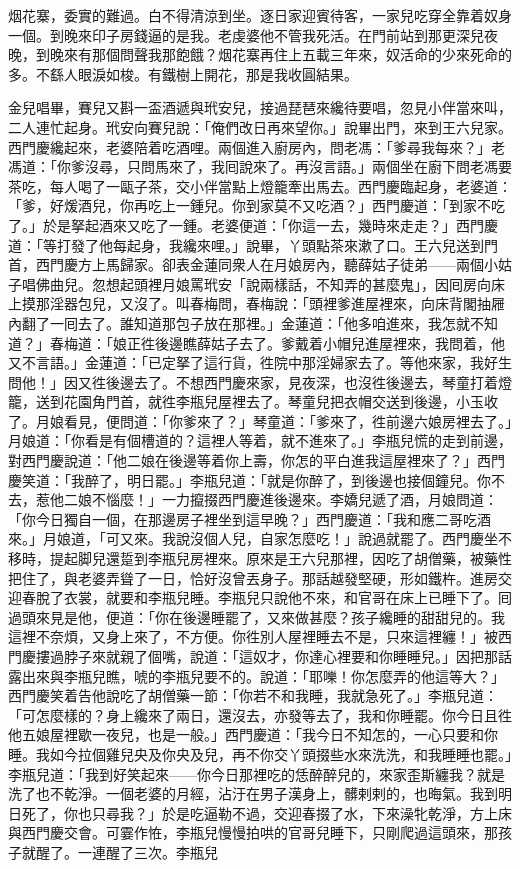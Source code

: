 \begin{myquote} 
烟花寨，委實的難過。白不得清涼到坐。逐日家迎賓待客，一家兒吃穿全靠着奴身一個。到晚來印子房錢逼的是我。老虔婆他不管我死活。在門前站到那更深兒夜晚，到晚來有那個問聲我那飽餓？烟花寨再住上五載三年來，奴活命的少來死命的多。不繇人眼淚如梭。有鐵樹上開花，那是我收圓結果。
\end{myquote} 

金兒唱畢，賽兒又斟一盃酒遞與玳安兒，接過琵琶來纔待要唱，忽見小伴當來叫，二人連忙起身。玳安向賽兒說：「俺們改日再來望你。」說畢出門，來到王六兒家。西門慶纔起來，老婆陪着吃酒哩。兩個進入廚房內，問老馮：「爹尋我每來？」老馮道：「你爹沒尋，只問馬來了，我囘說來了。再沒言語。」兩個坐在廚下問老馮要茶吃，每人喝了一甌子茶，交小伴當點上燈籠牽出馬去。西門慶臨起身，老婆道：「爹，好煖酒兒，你再吃上一鍾兒。你到家莫不又吃酒？」西門慶道：「到家不吃了。」於是拏起酒來又吃了一鍾。老婆便道：「你這一去，幾時來走走？」西門慶道：「等打發了他每起身，我纔來哩。」說畢，丫頭點茶來漱了口。王六兒送到門首，西門慶方上馬歸家。卻表金蓮同衆人在月娘房內，聽薛姑子徒弟——兩個小姑子唱佛曲兒。忽想起頭裡月娘罵玳安「說兩樣話，不知弄的甚麼鬼」，因囘房向床上摸那淫器包兒，又沒了。叫春梅問，春梅說：「頭裡爹進屋裡來，向床背閣抽屜內翻了一囘去了。誰知道那包子放在那裡。」金蓮道：「他多咱進來，我怎就不知道？」春梅道：「娘正徃後邊瞧薛姑子去了。爹戴着小帽兒進屋裡來，我問着，他又不言語。」金蓮道：「已定拏了這行貨，徃院中那淫婦家去了。等他來家，我好生問他！」因又徃後邊去了。不想西門慶來家，見夜深，也沒徃後邊去，琴童打着燈籠，送到花園角門首，就徃李瓶兒屋裡去了。琴童兒把衣帽交送到後邊，小玉收了。月娘看見，便問道：「你爹來了？」琴童道：「爹來了，徃前邊六娘房裡去了。」月娘道：「你看是有個槽道的？這裡人等着，就不進來了。」李瓶兒慌的走到前邊，對西門慶說道：「他二娘在後邊等着你上壽，你怎的平白進我這屋裡來了？」西門慶笑道：「我醉了，明日罷。」李瓶兒道：「就是你醉了，到後邊也接個鐘兒。你不去，惹他二娘不惱麼！」一力攛掇西門慶進後邊來。李嬌兒遞了酒，月娘問道：「你今日獨自一個，在那邊房子裡坐到這早晚？」西門慶道：「我和應二哥吃酒來。」月娘道，「可又來。我說沒個人兒，自家怎麼吃！」說過就罷了。西門慶坐不移時，提起脚兒還踅到李瓶兒房裡來。原來是王六兒那裡，因吃了胡僧藥，被藥性把住了，與老婆弄聳了一日，恰好沒曾丟身子。那話越發堅硬，形如鐵杵。進房交迎春脫了衣裳，就要和李瓶兒睡。李瓶兒只說他不來，和官哥在床上已睡下了。囘過頭來見是他，便道：「你在後邊睡罷了，又來做甚麼？孩子纔睡的甜甜兒的。我這裡不奈煩，又身上來了，不方便。你徃別人屋裡睡去不是，只來這裡纏！」被西門慶摟過脖子來就親了個嘴，說道：「這奴才，你達心裡要和你睡睡兒。」因把那話露出來與李瓶兒瞧，唬的李瓶兒要不的。說道：「耶嚛！你怎麼弄的他這等大？」西門慶笑着告他說吃了胡僧藥一節：「你若不和我睡，我就急死了。」李瓶兒道：「可怎麼樣的？身上纔來了兩日，還沒去，亦發等去了，我和你睡罷。你今日且徃他五娘屋裡歇一夜兒，也是一般。」西門慶道：「我今日不知怎的，一心只要和你睡。我如今拉個雞兒央及你央及兒，再不你交丫頭掇些水來洗洗，和我睡睡也罷。」李瓶兒道：「我到好笑起來——你今日那裡吃的恁醉醉兒的，來家歪斯纏我？就是洗了也不乾淨。一個老婆的月經，沾汙在男子漢身上，髒剌剌的，也晦氣。我到明日死了，你也只尋我？」於是吃逼勒不過，交迎春掇了水，下來澡牝乾淨，方上床與西門慶交會。可霎作恠，李瓶兒慢慢拍哄的官哥兒睡下，只剛爬過這頭來，那孩子就醒了。一連醒了三次。李瓶兒